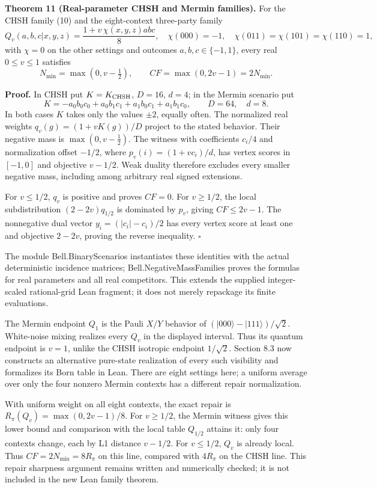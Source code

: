 \documentclass[
]{article}
\begin{document}
\textbf{Theorem 11 (Real-parameter CHSH and Mermin families).} For the CHSH family (10) and the eight-context three-party family
\[
Q_v(a,b,c|x,y,z)=\frac{1+v\,\chi(x,y,z)abc}{8},
\quad
\chi(000)=-1,\quad
\chi(011)=\chi(101)=\chi(110)=1,
\]
with \(\chi=0\) on the other settings and outcomes \(a,b,c\in\{-1,1\}\), every real \(0\le v\le1\) satisfies
\[
N_{\min}=\max(0,v-\tfrac12),\qquad
CF=\max(0,2v-1)=2N_{\min}.
\tag{32}
\]

\textbf{Proof.} In CHSH put \(K=K_{\rm CHSH}\), \(D=16\), \(d=4\); in the Mermin scenario put
\[
K=-a_0b_0c_0+a_0b_1c_1+a_1b_0c_1+a_1b_1c_0,
\qquad D=64,\quad d=8.
\]
In both cases \(K\) takes only the values \(\pm2\), equally often. The normalized real weights \(q_v(g)=(1+vK(g))/D\) project to the stated behavior. Their negative mass is \(\max(0,v-\tfrac12)\). The witness with coefficients \(c_i/4\) and normalization offset \(-1/2\), where \(p_v(i)=(1+vc_i)/d\), has vertex scores in \([-1,0]\) and objective \(v-1/2\). Weak duality therefore excludes every smaller negative mass, including among arbitrary real signed extensions.

For \(v\le1/2\), \(q_v\) is positive and proves \(CF=0\). For \(v\ge1/2\), the local subdistribution \((2-2v)q_{1/2}\) is dominated by \(p_v\), giving \(CF\le2v-1\). The nonnegative dual vector \(y_i=(|c_i|-c_i)/2\) has every vertex score at least one and objective \(2-2v\), proving the reverse inequality. \(\square\)

The module Bell.BinaryScenarios instantiates these identities with the actual deterministic incidence matrices; Bell.NegativeMassFamilies proves the formulas for real parameters and all real competitors. This extends the supplied integer-scaled rational-grid Lean fragment; it does not merely repackage its finite evaluations.

The Mermin endpoint \(Q_1\) is the Pauli \(X/Y\) behavior of \((|000\rangle-|111\rangle)/\sqrt2\). White-noise mixing realizes every \(Q_v\) in the displayed interval. Thus its quantum endpoint is \(v=1\), unlike the CHSH isotropic endpoint \(1/\sqrt2\). Section 8.3 now constructs an alternative pure-state realization of every such visibility and formalizes its Born table in Lean. There are eight settings here; a uniform average over only the four nonzero Mermin contexts has a different repair normalization.

With uniform weight on all eight contexts, the exact repair is \(R_\pi(Q_v)=\max(0,2v-1)/8\). For \(v\ge1/2\), the Mermin witness gives this lower bound and comparison with the local table \(Q_{1/2}\) attains it: only four contexts change, each by L1 distance \(v-1/2\). For \(v\le1/2\), \(Q_v\) is already local. Thus \(CF=2N_{\min}=8R_\pi\) on this line, compared with \(4R_\pi\) on the CHSH line. This repair sharpness argument remains written and numerically checked; it is not included in the new Lean family theorem.
\end{document}
